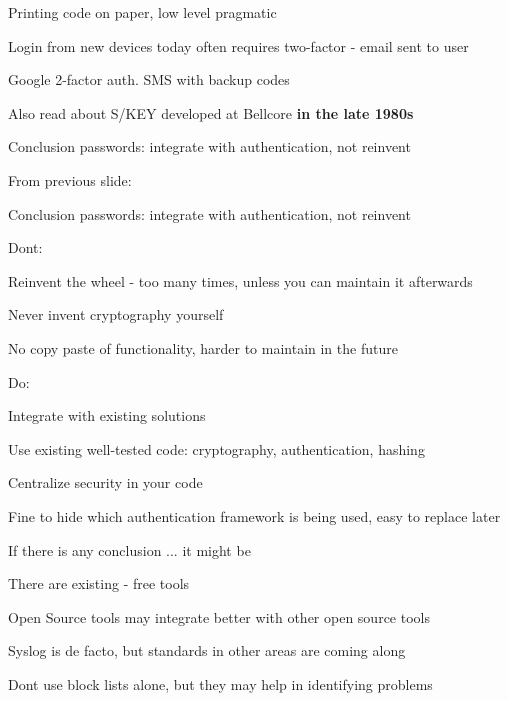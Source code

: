 \documentclass[20pt,landscape,a4paper,footrule]{foils}
\begin{document}


\centerline{\Large Printing code on paper, low level pragmatic }


\begin{list1}
\item Login from new devices today often requires two-factor - email sent to user
\item Google 2-factor auth. SMS with backup codes
\item Also read about S/KEY developed at Bellcore {\bf in the late 1980s}\\ 
\end{list1}

\centerline{Conclusion passwords: integrate with authentication, not reinvent}


From previous slide:\\
\centerline{Conclusion passwords: integrate with authentication, not reinvent}


\begin{list1}
\item Dont:
\begin{list2}
\item Reinvent the wheel - too many times, unless you can maintain it afterwards
\item Never invent cryptography yourself
\item No copy paste of functionality, harder to maintain in the future
\end{list2}
\item Do:
\begin{list2}
\item Integrate with existing solutions
\item Use existing well-tested code: cryptography, authentication, hashing
\item Centralize security in your code
\item Fine to hide which authentication framework is being used, easy to replace later
\end{list2}
\end{list1}


\begin{list1}
\item If there is any conclusion ... it might be
\item There are existing - free tools
\item Open Source tools may integrate better with other open source tools
\item Syslog is de facto, but standards in other areas are coming along
\item Dont use block lists alone, but they may help in identifying problems
\end{list1}


\myquestionspage
\end{document}
